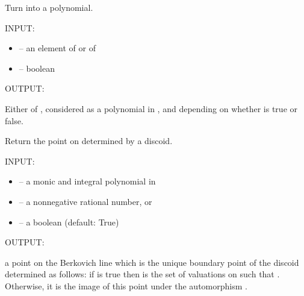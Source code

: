 \documentclass[letterpaper,10pt,english]{sphinxmanual}
\begin{document}
\begin{fulllineitems}
\begin{fulllineitems}
\end{fulllineitems}


\begin{fulllineitems}
\label{berkovich_line:mclf.berkovich.berkovich_line.BerkovichLine.make_polynomial}
Turn  into a polynomial.

INPUT:
\begin{itemize}
\item {} 
 -- an element of  or of 

\item {} 
 -- boolean

\end{itemize}

OUTPUT:

Either  of , considered as a polynomial in ,
and depending on whether  is true or false.

\end{fulllineitems}


\begin{fulllineitems}
\label{berkovich_line:mclf.berkovich.berkovich_line.BerkovichLine.point_from_discoid}
Return the point on  determined by a discoid.

INPUT:
\begin{itemize}
\item {} 
 -- a monic and integral polynomial in 

\item {} 
 -- a nonnegative rational number, or 

\item {} 
 -- a boolean (default: True)

\end{itemize}

OUTPUT:

a point  on the Berkovich line  which is the unique
boundary point of the discoid  determined as follows: if
 is true then  is the set of valuations  on
 such that . Otherwise, it is the image of this
point under the automorphism .


\end{fulllineitems}
\end{fulllineitems}
\end{document}
